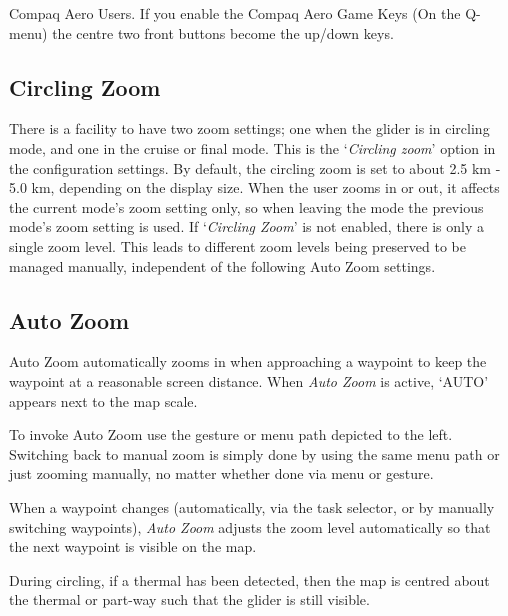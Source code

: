 Compaq Aero Users. If you enable the Compaq Aero Game Keys (On the
Q-menu) the centre two front buttons become the up/down keys.

\subsection*{Circling Zoom}
There is a facility to have two zoom settings; one when the glider is
in circling mode, and one in the cruise or final mode.  This is the `\emph{Circling zoom}' 
option in the  configuration settings.  
By default, the circling zoom is set to about 2.5 km - 5.0 km, depending on the
display size. When the user zooms in or out, it affects the current
mode's zoom setting only, so when leaving the mode the previous mode's
zoom setting is used.  If `\emph{Circling Zoom}' is not enabled,
there is only a single zoom level.
This leads to different zoom levels being preserved to be managed manually, 
independent of the following Auto Zoom settings.

\subsection*{Auto Zoom}
Auto Zoom automatically zooms in when approaching a waypoint to keep
the waypoint at a reasonable screen distance. When \emph{Auto Zoom} is active,
`AUTO' appears next to the map scale.

To invoke Auto Zoom use the gesture 
or menu path depicted to the left. 
Switching back to manual zoom is simply done by using the same menu path
or just zooming manually, no matter whether done via menu or gesture.

When a waypoint changes (automatically, via the task selector, or by
manually switching waypoints), \emph{Auto Zoom} adjusts the zoom level
automatically so that the next waypoint is visible on the map.

During circling, if a thermal has been detected, then the map is centred about
the thermal or part-way such that the glider is still visible.

